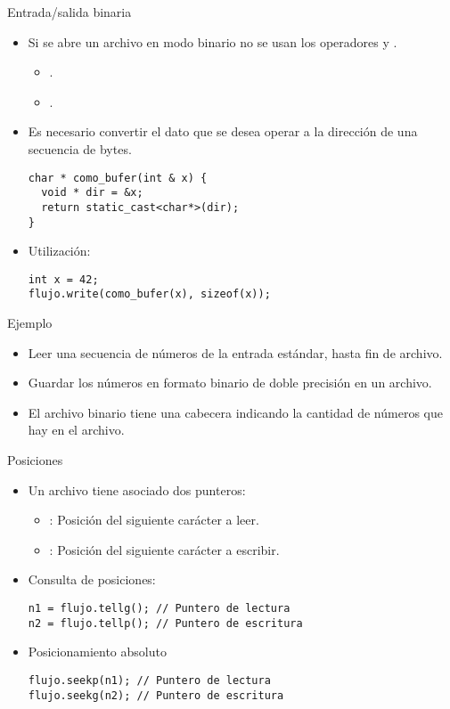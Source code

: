 \begin{frame}[t,fragile]{Entrada/salida binaria}
\begin{itemize}
  \item Si se abre un archivo en modo binario no se usan los operadores \cppid{<{}<} y \cppid{>{}>}.
    \begin{itemize}
      \item {}.
      \item {}.
    \end{itemize}

  \item Es necesario convertir el dato que se desea operar a la dirección de una secuencia de bytes.
\begin{lstlisting}
char * como_bufer(int & x) {
  void * dir = &x;
  return static_cast<char*>(dir);
}
\end{lstlisting}

  \item Utilización:
\begin{lstlisting}
int x = 42;
flujo.write(como_bufer(x), sizeof(x));
\end{lstlisting}
\end{itemize}
\end{frame}

\begin{frame}[t]{Ejemplo}
\begin{itemize}
  \item Leer una secuencia de números de la entrada estándar, hasta fin de archivo.
  \item Guardar los números en formato binario de doble precisión en un archivo.
  \item El archivo binario tiene una cabecera indicando la cantidad de números que hay en el archivo.
\end{itemize}
\end{frame}

\begin{frame}[t,fragile]{Posiciones}
\begin{itemize}
  \item Un archivo tiene asociado dos punteros:
    \begin{itemize}
      \item {}: Posición del siguiente carácter a leer.
      \item {}: Posición del siguiente carácter a escribir.
    \end{itemize}
  \item Consulta de posiciones:
\begin{lstlisting}
n1 = flujo.tellg(); // Puntero de lectura
n2 = flujo.tellp(); // Puntero de escritura
\end{lstlisting}
  \item Posicionamiento absoluto
\begin{lstlisting}
flujo.seekp(n1); // Puntero de lectura
flujo.seekg(n2); // Puntero de escritura
\end{lstlisting}
\end{itemize}
\end{frame}


